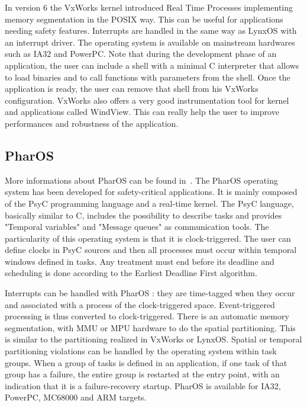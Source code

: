 \documentclass[10pt]{report}
\begin{document}
In version 6 the VxWorks kernel introduced Real Time Processes implementing memory segmentation in the POSIX way. This can be useful for 
applications needing safety features. Interrupts are handled in the same way as LynxOS with an interrupt driver. The operating system is 
available on mainstream hardwares such as IA32 and PowerPC. Note that during the development phase of an application, the user can include 
a shell with a minimal C interpreter that allows to load binaries and to call functions with parameters from the shell. Once the application 
is ready, the user can remove that shell from his VxWorks configuration. VxWorks also offers a very good instrumentation tool for kernel and 
applications called WindView. This can really help the user to improve performances and robustness of the application.

\subsection{PharOS}

More informations about PharOS can be found in~\cite{OASIS:98}. The PharOS operating system has been developed for safety-critical
applications. It is mainly composed of the PsyC programming language and a real-time kernel. The PsyC language, basically similar to C, 
includes the possibility to describe tasks and provides "Temporal variables" and "Message queues" as communication tools.
The particularity of this operating system is that it is clock-triggered. The user can define clocks in PsyC sources and then all
processes must occur within temporal windows defined in tasks. Any treatment must end before its deadline and scheduling is done according
to the Earliest Deadline First algorithm.

Interrupts can be handled with PharOS : they are time-tagged when they occur and associated with a process of the clock-triggered
space. Event-triggered processing is thus converted to clock-triggered. There is an automatic memory segmentation, with MMU
or MPU hardware to do the spatial partitioning. This is similar to the partitioning realized in VxWorks or LynxOS. Spatial or temporal
partitioning violations can be handled by the operating system within task groups. When a group of tasks is defined in an application, if 
one task of that group has a failure, the entire group is restarted at the entry point, with an indication that it is a failure-recovery 
startup. PharOS is available for IA32, PowerPC, MC68000 and ARM targets.
\end{document}
